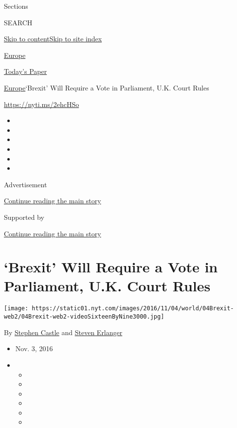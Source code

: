 Sections

SEARCH

\protect\hyperlink{site-content}{Skip to
content}\protect\hyperlink{site-index}{Skip to site index}

\href{https://www.nytimes.com/section/world/europe}{Europe}

\href{https://myaccount.nytimes.com/auth/login?response_type=cookie\&client_id=vi}{}

\href{https://www.nytimes.com/section/todayspaper}{Today's Paper}

\href{/section/world/europe}{Europe}\textbar{}`Brexit' Will Require a
Vote in Parliament, U.K. Court Rules

\url{https://nyti.ms/2ehcHSo}

\begin{itemize}
\item
\item
\item
\item
\item
\item
\end{itemize}

Advertisement

\protect\hyperlink{after-top}{Continue reading the main story}

Supported by

\protect\hyperlink{after-sponsor}{Continue reading the main story}

\hypertarget{brexit-will-require-a-vote-in-parliament-uk-court-rules}{%
\section{`Brexit' Will Require a Vote in Parliament, U.K. Court
Rules}\label{brexit-will-require-a-vote-in-parliament-uk-court-rules}}

\texttt{[image: https://static01.nyt.com/images/2016/11/04/world/04Brexit-web2/04Brexit-web2-videoSixteenByNine3000.jpg]}

By \href{http://www.nytimes.com/by/stephen-castle}{Stephen Castle} and
\href{http://www.nytimes.com/by/steven-erlanger}{Steven Erlanger}

\begin{itemize}
\item
  Nov. 3, 2016
\item
  \begin{itemize}
  \item
  \item
  \item
  \item
  \item
  \item
  \end{itemize}
\end{itemize}


